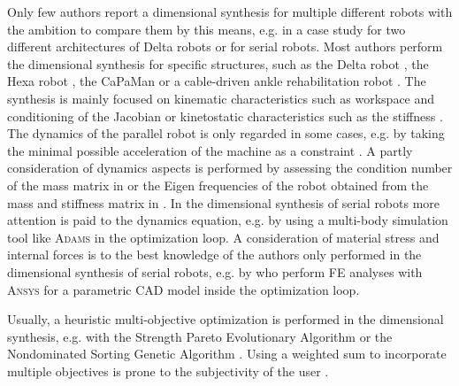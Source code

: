 \documentclass[fleqn,a4paper,10pt]{article}
\begin{document}
\begin{multicols}{2}
Only few authors report a dimensional synthesis for multiple different robots with the ambition to compare them by this means, e.g. \cite{Krefft2006} in a case study for two different architectures of Delta robots or \cite{Ramirez2018} for serial robots.
Most authors perform the dimensional synthesis for specific structures, such as the  Delta robot \cite{StockMil2003,KelaiaiaComZaa2012}, the Hexa robot \cite{Krefft2006}, the CaPaMan \cite{CarboneOttCec2007} or a cable-driven ankle rehabilitation robot \cite{JamwalHusXie2015}.
The synthesis is mainly focused on kinematic characteristics such as workspace and conditioning of the Jacobian or kinetostatic characteristics such as the stiffness \cite{CarboneOttCec2007,KelaiaiaComZaa2012}. %
The dynamics of the parallel robot is only regarded in some cases, e.g. by taking the minimal possible acceleration of the machine as a constraint \cite{Krefft2006}.
A partly consideration of dynamics aspects is performed by assessing the condition number of the mass matrix in \cite{KelaiaiaComZaa2012} or the Eigen frequencies of the robot obtained from the mass and stiffness matrix in \cite{JamwalHusXie2015}.
In the dimensional synthesis of serial robots more attention is paid to the dynamics equation, e.g. by \cite{ZhouBaiHan2011} using a multi-body simulation tool like \textsc{Adams} in the optimization loop.
A consideration of material stress and internal forces is to the best knowledge of the authors only performed in the dimensional synthesis of serial robots, e.g. by \cite{ZhouBai2015} who perform FE analyses with \textsc{Ansys} for a parametric CAD model inside the optimization loop.

Usually, a heuristic multi-objective optimization is performed in the dimensional synthesis, e.g. with the Strength Pareto Evolutionary Algorithm \cite{Krefft2006,KelaiaiaComZaa2012} or the Nondominated Sorting Genetic Algorithm \cite{JamwalHusXie2015}.
Using a weighted sum to incorporate multiple objectives is prone to the subjectivity of the user \cite{JamwalHusXie2015}. %



\end{multicols}
\end{document}
